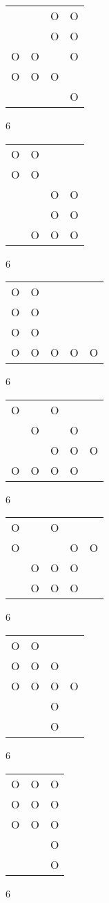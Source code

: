 \begin{tabular}{|m{0.2cm}m{0.2cm}m{0.2cm}m{0.2cm}|}\hline
 & &O&O\\
 & &O&O\\
O&O& &O\\
O&O&O& \\
 & & &O\\
\hline\end{tabular}6
\begin{tabular}{|m{0.2cm}m{0.2cm}m{0.2cm}m{0.2cm}|}\hline
O&O& & \\
O&O& & \\
 & &O&O\\
 & &O&O\\
 &O&O&O\\
\hline\end{tabular}6
\begin{tabular}{|m{0.2cm}m{0.2cm}m{0.2cm}m{0.2cm}m{0.2cm}|}\hline
O&O& & & \\
O&O& & & \\
O&O& & & \\
O&O&O&O&O\\
\hline\end{tabular}6
\begin{tabular}{|m{0.2cm}m{0.2cm}m{0.2cm}m{0.2cm}m{0.2cm}|}\hline
O& &O& & \\
 &O& &O& \\
 & &O&O&O\\
O&O&O&O& \\
\hline\end{tabular}6
\begin{tabular}{|m{0.2cm}m{0.2cm}m{0.2cm}m{0.2cm}m{0.2cm}|}\hline
O& &O& & \\
O& & &O&O\\
 &O&O&O& \\
 &O&O&O& \\
\hline\end{tabular}6
\begin{tabular}{|m{0.2cm}m{0.2cm}m{0.2cm}m{0.2cm}|}\hline
O&O& & \\
O&O&O& \\
O&O&O&O\\
 & &O& \\
 & &O& \\
\hline\end{tabular}6
\begin{tabular}{|m{0.2cm}m{0.2cm}m{0.2cm}|}\hline
O&O&O\\
O&O&O\\
O&O&O\\
 & &O\\
 & &O\\
\hline\end{tabular}6
